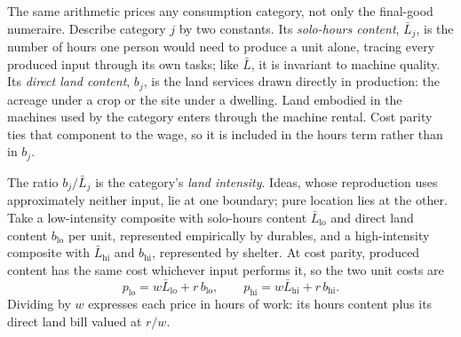\documentclass[12pt]{article}
\theoremstyle{plain}
\newcommand{\lo}{\mathrm{lo}}
\newcommand{\hi}{\mathrm{hi}}
\begin{document}
The same arithmetic prices any consumption category, not only the final-good numeraire. Describe category $j$ by two constants. Its \emph{solo-hours content}, $\bar{L}_j$, is the number of hours one person would need to produce a unit alone, tracing every produced input through its own tasks; like $\bar{L}$, it is invariant to machine quality. Its \emph{direct land content}, $b_j$, is the land services drawn directly in production: the acreage under a crop or the site under a dwelling. Land embodied in the machines used by the category enters through the machine rental. Cost parity ties that component to the wage, so it is included in the hours term rather than in $b_j$.

The ratio $b_j/\bar{L}_j$ is the category's \emph{land intensity}. Ideas, whose reproduction uses approximately neither input, lie at one boundary; pure location lies at the other. Take a low-intensity composite with solo-hours content $\bar{L}_{\lo}$ and direct land content $b_{\lo}$ per unit, represented empirically by durables, and a high-intensity composite with $\bar{L}_{\hi}$ and $b_{\hi}$, represented by shelter. At cost parity, produced content has the same cost whichever input performs it, so the two unit costs are
\begin{equation}\label{eq:composites}
p_{\lo} = w\bar{L}_{\lo} + r\, b_{\lo},
\qquad
p_{\hi} = w\bar{L}_{\hi} + r\, b_{\hi}.
\end{equation}
Dividing by $w$ expresses each price in hours of work: its hours content plus its direct land bill valued at $r/w$.
\end{document}

